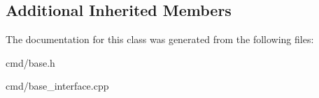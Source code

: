 \subsection*{Additional Inherited Members}


The documentation for this class was generated from the following files\+:\begin{DoxyCompactItemize}
\item 
cmd/base.\+h\item 
cmd/base\+\_\+interface.\+cpp\end{DoxyCompactItemize}

